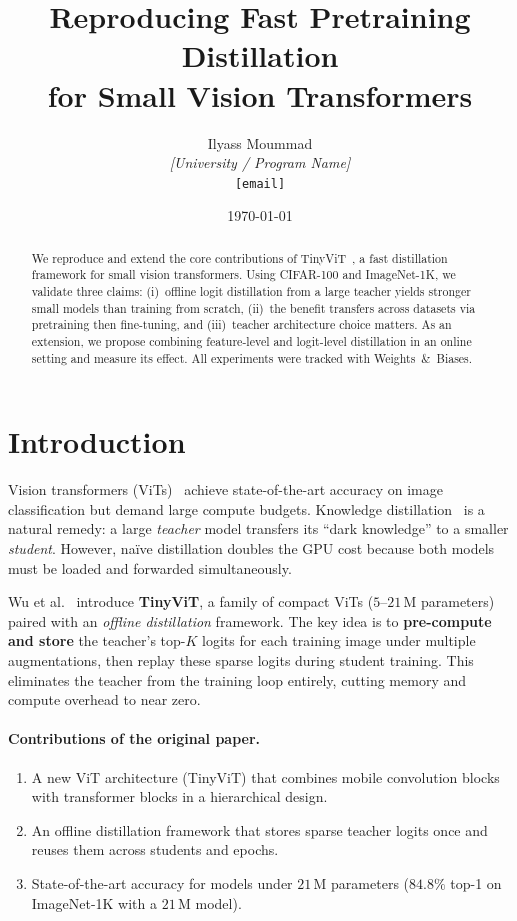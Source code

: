 \documentclass[10pt,twocolumn]{article}
\title{Reproducing Fast Pretraining Distillation\\for Small Vision Transformers}
\author{
  Ilyass Moummad \\
  \textit{[University / Program Name]} \\
  \texttt{[email]}
}
\date{\today}
\begin{document}
\maketitle

\begin{abstract}
We reproduce and extend the core contributions of TinyViT~\cite{wu2022tinyvit},
a fast distillation framework for small vision transformers.
Using CIFAR-100 and ImageNet-1K, we validate three claims:
(i)~offline logit distillation from a large teacher yields stronger small
models than training from scratch,
(ii)~the benefit transfers across datasets via pretraining then fine-tuning,
and (iii)~teacher architecture choice matters.
As an extension, we propose combining feature-level and logit-level
distillation in an online setting and measure its effect.
All experiments were tracked with Weights~\&~Biases.
\end{abstract}

\section{Introduction}
\label{sec:intro}

Vision transformers (ViTs)~\cite{dosovitskiy2020image} achieve state-of-the-art
accuracy on image classification but demand large compute budgets.
Knowledge distillation~\cite{hinton2015distilling} is a natural remedy: a large
\emph{teacher} model transfers its ``dark knowledge'' to a smaller \emph{student}.
However, na\"ive distillation doubles the GPU cost because both models must be
loaded and forwarded simultaneously.

Wu et al.~\cite{wu2022tinyvit} introduce \textbf{TinyViT}, a family of compact
ViTs ($5$--$21$\,M parameters) paired with an \emph{offline distillation}
framework.
The key idea is to \textbf{pre-compute and store} the teacher's top-$K$ logits
for each training image under multiple augmentations, then replay these
sparse logits during student training.
This eliminates the teacher from the training loop entirely, cutting memory
and compute overhead to near zero.

\paragraph{Contributions of the original paper.}
\begin{enumerate}
  \item A new ViT architecture (TinyViT) that combines mobile convolution
        blocks with transformer blocks in a hierarchical design.
  \item An offline distillation framework that stores sparse teacher logits
        once and reuses them across students and epochs.
  \item State-of-the-art accuracy for models under $21$\,M parameters
        ($84.8\%$ top-1 on ImageNet-1K with a $21$\,M model).
\end{enumerate}
\end{document}
